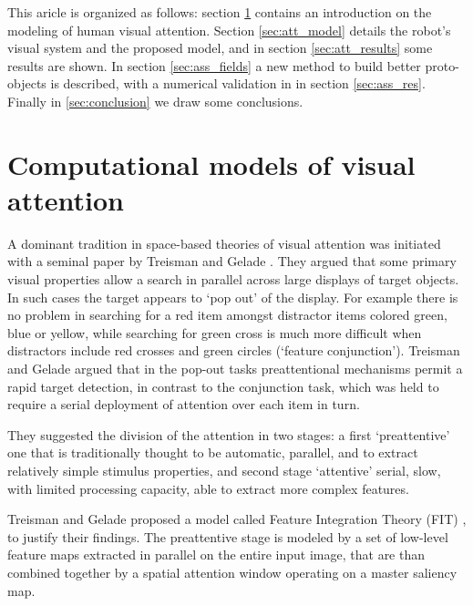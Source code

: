 \documentclass{llncs}
\begin{document}

This aricle is organized as follows:
section \ref{sec:att_comp_models} contains an introduction on the modeling of
human visual attention. Section \ref{sec:att_model}
details the robot's visual system and the
proposed model, and in section \ref{sec:att_results} some results are shown.
In section \ref{sec:ass_fields} a new method to build better proto-objects is described,
with a numerical validation in in section \ref{sec:ass_res}. Finally in \ref{sec:conclusion}
we draw some conclusions.


\section{Computational models of visual attention}
\label{sec:att_comp_models}

A dominant tradition in space-based theories of visual attention was initiated
with a seminal paper by Treisman and Gelade \cite{TreismanG80}. They argued
that some primary visual properties allow a search in parallel across large
displays of target objects. In such cases the target appears to `pop out' of
the display. For example there is no problem in searching for a red item
amongst distractor items colored green, blue or yellow, while searching for
green cross is much more difficult when distractors include red crosses and
green circles (`feature conjunction').
Treisman and Gelade argued that in the pop-out tasks preattentional mechanisms
permit a rapid target detection, in contrast to the conjunction task, which was held
to require a serial deployment of attention over each item in turn.

They suggested the division of the attention in two stages: a first `preattentive' one that is traditionally thought to be
automatic, parallel, and to extract relatively simple stimulus properties, and second stage
`attentive' serial, slow, with limited processing capacity, able to extract more complex features.

Treisman and Gelade proposed a model called Feature Integration Theory (FIT) \cite{TreismanG80},
to justify their findings. The preattentive stage is
modeled by a set of low-level feature maps extracted
in parallel on the entire input image, that are than combined
together by a spatial attention window operating on a
master saliency map.
\end{document}
